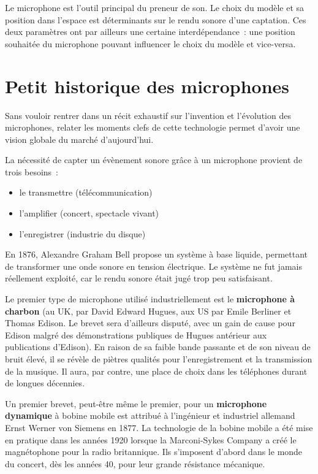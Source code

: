 \documentclass[
  letterpaper,
  DIV=11,
  numbers=noendperiod]{scrreprt}
\providecommand{\tightlist}{%
  \setlength{\itemsep}{0pt}\setlength{\parskip}{0pt}}\usepackage{longtable,booktabs,array}
\begin{document}
Le microphone est l'outil principal du preneur de son. Le choix du
modèle et sa position dans l'espace est déterminants sur le rendu sonore
d'une captation. Ces deux paramètres ont par ailleurs une certaine
interdépendance~: une position souhaitée du microphone pouvant
influencer le choix du modèle et vice-versa.

\hypertarget{petit-historique-des-microphones}{%
\section{Petit historique des
microphones}\label{petit-historique-des-microphones}}

Sans vouloir rentrer dans un récit exhaustif sur l'invention et
l'évolution des microphones, relater les moments clefs de cette
technologie permet d'avoir une vision globale du marché d'aujourd'hui.

La nécessité de capter un évènement sonore grâce à un microphone
provient de trois besoins~:

\begin{itemize}
\tightlist
\item
  le transmettre (télécommunication)
\item
  l'amplifier (concert, spectacle vivant)
\item
  l'enregistrer (industrie du disque)
\end{itemize}

En 1876, Alexandre Graham Bell propose un système à base liquide,
permettant de transformer une onde sonore en tension électrique. Le
système ne fut jamais réellement exploité, car le rendu sonore était
jugé trop peu satisfaisant.

Le premier type de microphone utilisé industriellement est le
\textbf{microphone à charbon} (au UK, par David Edward Hugues, aux US
par Emile Berliner et Thomas Edison. Le brevet sera d'ailleurs disputé,
avec un gain de cause pour Edison malgré des démonstrations publiques de
Hugues antérieur aux publications d'Edison). En raison de sa faible
bande passante et de son niveau de bruit élevé, il se révèle de piètres
qualités pour l'enregistrement et la transmission de la musique. Il
aura, par contre, une place de choix dans les téléphones durant de
longues décennies.

Un premier brevet, peut-être même le premier, pour un \textbf{microphone
dynamique} à bobine mobile est attribué à l'ingénieur et industriel
allemand Ernst Werner von Siemens en 1877. La technologie de la bobine
mobile a été mise en pratique dans les années 1920 lorsque la
Marconi-Sykes Company a créé le magnétophone pour la radio britannique.
Ils s'imposent d'abord dans le monde du concert, dès les années 40, pour
leur grande résistance mécanique.
\end{document}
